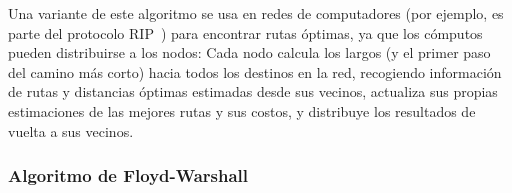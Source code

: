 
  Una variante de este algoritmo se usa en redes de computadores
  (por ejemplo, es parte del protocolo RIP~\cite{RFC4822})%
  para encontrar rutas óptimas,
  ya que los cómputos pueden distribuirse a los nodos:
  Cada nodo calcula los largos
  (y el primer paso del camino más corto)
  hacia todos los destinos en la red,
  recogiendo información de rutas y distancias óptimas estimadas
  desde sus vecinos,
  actualiza sus propias estimaciones de las mejores rutas
  y sus costos,
  y distribuye los resultados de vuelta a sus vecinos.


\subsubsection{Algoritmo de Floyd-Warshall}
\label{sec:Floyd-Warshall}


